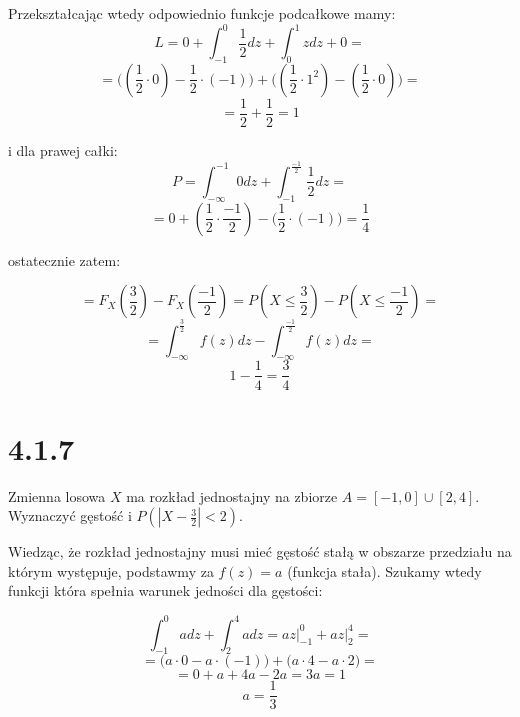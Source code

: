 \documentclass{article}
\begin{document}
Przekształcając wtedy odpowiednio funkcje podcałkowe mamy:
\begin{equation*}
    L = 0 + \int_{-1}^{0} \frac{1}{2} dz + \int_{0}^{1} z dz + 0 =
\end{equation*}
\begin{equation*}
    = \big((\frac{1}{2} \cdot 0) - \frac{1}{2} \cdot (-1)\big) + \big((\frac{1}{2} \cdot 1^{2}) - (\frac{1}{2} \cdot 0)\big) =
\end{equation*}
\begin{equation*}
    = \frac{1}{2} + \frac{1}{2} = 1
\end{equation*}

i dla prawej całki:
\begin{equation*}
    P = \int_{- \infty}^{-1} 0 dz + \int_{- 1}^{\frac{-1}{2}} \frac{1}{2} dz =
\end{equation*}
\begin{equation*}
    = 0 + (\frac{1}{2} \cdot \frac{-1}{2}) - \big(\frac{1}{2} \cdot (-1)\big) = \frac{1}{4}
\end{equation*}

ostatecznie zatem:

\begin{equation*}
    = F_{X}(\frac{3}{2}) - F_{X}(\frac{-1}{2}) = P(X \leq \frac{3}{2}) - P(X \leq \frac{-1}{2}) =
\end{equation*}
\begin{equation*}
    = \int_{- \infty}^{\frac{3}{2}} f(z) dz - \int_{- \infty}^{\frac{-1}{2}} f(z) dz =
\end{equation*}
\begin{equation*}
    1 - \frac{1}{4} = \frac{3}{4}
\end{equation*}



\section*{4.1.7}
\begin{center}
    Zmienna losowa \(X\) ma rozkład jednostajny na zbiorze \(A = [-1, 0] \cup [2, 4]\). Wyznaczyć gęstość i \(P(|X - \frac{3}{2}| < 2)\).
\end{center}

Wiedząc, że rozkład jednostajny musi mieć gęstość stałą w obszarze przedziału na którym występuje,
podstawmy za \(f(z) = a\) (funkcja stała). Szukamy wtedy funkcji która spełnia warunek jedności dla gęstości:

\begin{equation*}
    \int_{-1}^{0} a dz + \int_{2}^{4} a dz = az \biggr\rvert_{-1}^{0} + az \biggr\rvert_{2}^{4} = 
\end{equation*}
\begin{equation*}
    = \Big(a \cdot 0 - a \cdot (-1)\Big) + \Big(a \cdot 4 - a \cdot 2\Big) = 
\end{equation*}
\begin{equation*}
    = 0 + a + 4a - 2a = 3a = 1
\end{equation*}
\begin{equation*}
    a = \frac{1}{3}
\end{equation*}
\end{document}
